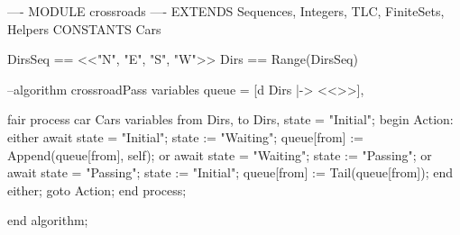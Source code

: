 \documentclass[14pt, openany]{report}
\begin{document}
\begin{tla}
---- MODULE crossroads ----
EXTENDS Sequences, Integers, TLC, FiniteSets, Helpers
CONSTANTS Cars

DirsSeq == <<"N", "E", "S", "W">>
Dirs == Range(DirsSeq)
\end{tla}
\begin{tlatex}
\@x{}\moduleLeftDash{}\moduleRightDash\@xx{}%
%
%
\@pvspace{8.0pt}%
%
\end{tlatex}
\begin{ppcal}
--algorithm crossroadPass
variables
  queue = [d \in Dirs |-> <<>>],

fair process car \in Cars
variables
  from \in Dirs, to \in Dirs, state = "Initial";
begin
  Action:
    either
      await state = "Initial";
      state := "Waiting";
      queue[from] := Append(queue[from], self);
    or
      await state = "Waiting";
      state := "Passing";
    or
      await state = "Passing";
      state := "Initial";
      queue[from] := Tail(queue[from]);
    end either;
    goto Action;
end process;

end algorithm;
\end{ppcal}
\begin{tlatex}
%
\@x{ {\p@variables}}%
\@pvspace{8.0pt}%
%
\@x{ {\p@variables}}%
\@x{ {\p@begin}}%
%
%
%
%
%
%
%
%
%
%
%
%
%
\@x{ {\p@end} {\p@process} {\p@semicolon}}%
\@pvspace{8.0pt}%
\@x{ {\p@end} {\p@algorithm} {\p@semicolon}}%
\end{tlatex}
\end{document}
